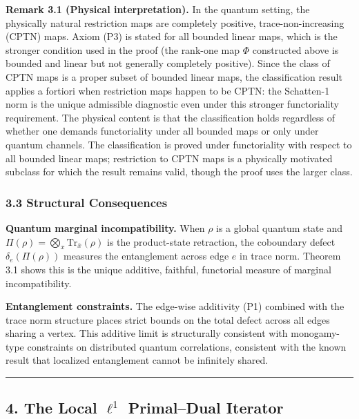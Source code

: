 \documentclass[
]{article}
\begin{document}
\textbf{Remark 3.1 (Physical interpretation).} In the quantum setting,
the physically natural restriction maps are completely positive,
trace-non-increasing (CPTN) maps. Axiom (P3) is stated for all bounded
linear maps, which is the stronger condition used in the proof (the
rank-one map \(\Phi\) constructed above is bounded and linear but not
generally completely positive). Since the class of CPTN maps is a proper
subset of bounded linear maps, the classification result applies a
fortiori when restriction maps happen to be CPTN: the Schatten-1 norm is
the unique admissible diagnostic even under this stronger functoriality
requirement. The physical content is that the classification holds
regardless of whether one demands functoriality under all bounded maps
or only under quantum channels. The classification is proved under
functoriality with respect to all bounded linear maps; restriction to
CPTN maps is a physically motivated subclass for which the result
remains valid, though the proof uses the larger class.

\subsubsection{3.3 Structural
Consequences}\label{structural-consequences}

\textbf{Quantum marginal incompatibility.} When \(\rho\) is a global
quantum state and
\(\Pi(\rho) = \bigotimes_x \mathrm{Tr}_{\bar{x}}(\rho)\) is the
product-state retraction, the coboundary defect \(\delta_e(\Pi(\rho))\)
measures the entanglement across edge \(e\) in trace norm. Theorem 3.1
shows this is the unique additive, faithful, functorial measure of
marginal incompatibility.

\textbf{Entanglement constraints.} The edge-wise additivity (P1)
combined with the trace norm structure places strict bounds on the total
defect across all edges sharing a vertex. This additive limit is
structurally consistent with monogamy-type constraints on distributed
quantum correlations, consistent with the known result that localized
entanglement cannot be infinitely shared.

\begin{center}\rule{0.5\linewidth}{0.5pt}\end{center}

\subsection{\texorpdfstring{4. The Local \(\ell^1\) Primal--Dual
Iterator}{4. The Local \textbackslash ell\^{}1 Primal--Dual Iterator}}\label{the-local-ell1-primaldual-iterator}
\end{document}
